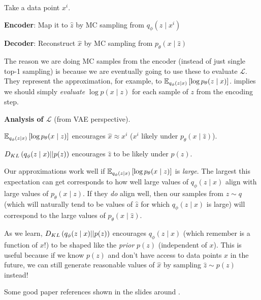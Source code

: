 \documentclass[11pt]{article}
\begin{document}
\begin{algorithm}[VAE]
	\begin{compactenum}
		\item Take a data point $x^i$. 
		\item \textbf{Encoder}: Map it to $\hat z$ by MC sampling from $q_{\phi}(z \mid x^i)$ 
		\item \textbf{Decoder}: Reconstruct $\hat x$ by MC sampling from $p_{\theta}(x \mid \hat z)$
	\end{compactenum}
	The reason we are doing MC samples from the encoder (instead of just single top-1 sampling) is because we are eventually going to use these to evaluate $\mathcal L$. They represent the approximation, for example, to $\E[q_{\phi}(z \mid x)]{\log p_{\theta}(z \mid x)}$.  implies we should simply \textit{evaluate} $\log p(x \mid z)$ for each sample of $z$ from the encoding step.\\
	
\end{algorithm}

\textbf{Analysis of $\mathcal L$} (from VAE perspective). 
\begin{compactitem}
	\item $\E[q_{\phi}(z \mid x)]{\log p_{\theta}(x \mid z)}$ encourages $\hat x \approx x^i$ ($x^i$ likely under $p_{\theta}(x \mid \hat z)$). 
	
	\item $\dkl{q_{\phi}(z \mid x)}{p(z)}$ encourages $\hat z$ to be likely under $p(z)$.
	
	\item Our approximations work well if $\E[q_{\phi}(z \mid x)]{\log p_{\theta}(x \mid z)}$ is \textit{large}. The largest this expectation can get corresponds to how well large values of $q_{\phi}(z \mid x)$ align with large values of $p_{\theta}(x \mid z)$. If they \textit{do} align well, then our samples from $z \sim q$ (which will naturally tend to be values of $\hat z$ for which $q_{\phi}(z \mid x)$ is large) will correspond to the large values of $p_{\theta}(x \mid \hat z)$. 
	
	\item As we learn, $\dkl{q_{\phi}(z \mid x)}{p(z)}$ encourages $q_{\phi}(z \mid x)$ (which remember is a function of $x$!) to be shaped like the \textit{prior} $p(z)$ (independent of $x$). This is useful because if we know $p(z)$ and don't have access to data points $x$ in the future, we can still generate reasonable values of $\hat x$ by sampling $\hat z \sim p(z)$ instead!
\end{compactitem}
Some good paper references shown in the slides around .
\end{document}

